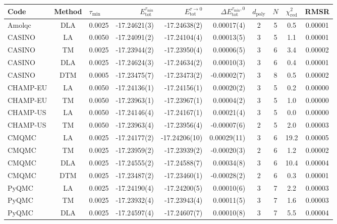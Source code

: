 \begin{tabular}{|lc|lr|r|r|cccc|}
\toprule
Code & Method & $\tau_\text{min}$ & $E_\text{tot}^{\tau_\text{min}}$ & $E_\text{tot}^{\tau\to 0}$ & $\Delta E_\text{tot}^{\tau_\text{min},0}$ & $d_\text{poly}$ & $N$ & $\chi^2_\textrm{red}$ & RMSR \\
\midrule
Amolqc           &  DLA  & 0.0025 & -17.24621(3) & -17.24638(2) & 0.00017(4) & 2 & 5 & 0.5 & 0.00001 \\
CASINO           &  LA   & 0.0050 & -17.24091(2) & -17.24104(4) & 0.00013(5) & 3 & 5 & 1.1 & 0.00001 \\
CASINO           &  TM   & 0.0025 & -17.23944(2) & -17.23950(4) & 0.00006(5) & 3 & 6 & 3.4 & 0.00002 \\
CASINO           &  DLA  & 0.0025 & -17.24624(3) & -17.24634(2) & 0.00010(3) & 3 & 6 & 0.4 & 0.00001 \\
CASINO           &  DTM  & 0.0005 & -17.23475(7) & -17.23473(2) & -0.00002(7) & 3 & 8 & 0.5 & 0.00002 \\
CHAMP-EU         &  LA   & 0.0050 & -17.24136(1) & -17.24156(1) & 0.00020(2) & 3 & 5 & 0.2 & 0.00000 \\
CHAMP-EU         &  TM   & 0.0050 & -17.23963(1) & -17.23967(1) & 0.00004(2) & 3 & 5 & 1.0 & 0.00000 \\
CHAMP-US         &  LA   & 0.0050 & -17.24146(4) & -17.24167(1) & 0.00021(4) & 3 & 5 & 0.0 & 0.00000 \\
CHAMP-US         &  TM   & 0.0050 & -17.23963(4) & -17.23956(4) & -0.00007(6) & 2 & 5 & 2.0 & 0.00003 \\
CMQMC            &  LA   & 0.0025 & -17.24177(2) & -17.24206(10) & 0.00029(11) & 3 & 6 & 19.2 & 0.00005 \\
CMQMC            &  TM   & 0.0025 & -17.23959(2) & -17.23939(2) & -0.00020(3) & 2 & 6 & 1.2 & 0.00002 \\
CMQMC            &  DLA  & 0.0025 & -17.24555(2) & -17.24588(7) & 0.00034(8) & 3 & 6 & 10.4 & 0.00004 \\
CMQMC            &  DTM  & 0.0025 & -17.23487(2) & -17.23460(1) & -0.00028(2) & 2 & 6 & 0.3 & 0.00001 \\
PyQMC            &  LA   & 0.0025 & -17.24190(4) & -17.24200(5) & 0.00010(6) & 3 & 7 & 2.2 & 0.00003 \\
PyQMC            &  TM   & 0.0025 & -17.23932(4) & -17.23943(4) & 0.00011(5) & 3 & 7 & 1.6 & 0.00003 \\
PyQMC            &  DLA  & 0.0025 & -17.24597(4) & -17.24607(7) & 0.00010(8) & 3 & 7 & 5.5 & 0.00004 \\

\end{tabular}
